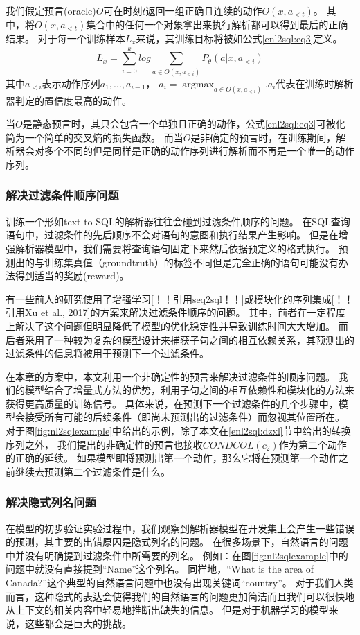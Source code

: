 我们假定预言(oracle)$O$可在时刻$t$返回一组正确且连续的动作$O(x,a_{<t})$。
其中，将$O(x,a_{<t})$集合中的任何一个对象拿出来执行解析都可以得到最后的正确结果。
对于每一个训练样本$L_x$来说，其训练目标将被如公式\ref{enl2sql:eq3}定义。
\begin{equation}
  \label{enl2sql:eq3}
  L_x = \sum_{i=0}^k log \sum_{a\in O(x,a_{<i})} P_{\theta}(a|x,a_{<i})
\end{equation}
其中$a_{<i}$表示动作序列$a_{1},...,a_{i-1}$，
$a_{i} = \mathop{\arg\max}_{a\in O(x,a_{<i})}$,$a_i$代表在训练时解析器判定的置信度最高的动作。

当$O$是静态预言时，其只会包含一个单独且正确的动作，公式\ref{enl2sql:eq3}可被化简为一个简单的交叉熵的损失函数。
而当$O$是非确定的预言时，在训练期间，解析器会对多个不同的但是同样是正确的动作序列进行解析而不再是一个唯一的动作序列。

\subsubsection{解决过滤条件顺序问题}
\label{enl2sql:om}

训练一个形如text-to-SQL的解析器往往会碰到过滤条件顺序的问题。
在SQL查询语句中，过滤条件的先后顺序不会对语句的意图和执行结果产生影响。
但是在增强解析器模型中，我们需要将查询语句固定下来然后依据预定义的格式执行。
预测出的与训练集真值（groundtruth）的标签不同但是完全正确的语句可能没有办法得到适当的奖励(reward)。

有一些前人的研究使用了增强学习[！！引用seq2sql！！]或模块化的序列集成[！！引用Xu et al., 2017]的方案来解决过滤条件顺序的问题。
其中，前者在一定程度上解决了这个问题但明显降低了模型的优化稳定性并导致训练时间大大增加。
而后者采用了一种较为复杂的模型设计来捕获子句之间的相互依赖关系，其预测出的过滤条件的信息将被用于预测下一个过滤条件。

在本章的方案中，本文利用一个非确定性的预言来解决过滤条件的顺序问题。
我们的模型结合了增量式方法的优势，利用子句之间的相互依赖性和模块化的方法来获得更高质量的训练信号。
具体来说，在预测下一个过滤条件的几个步骤中，模型会接受所有可能的后续条件（即尚未预测出的过滤条件）而忽视其位置所在。
对于图\ref{fig:nl2sqlexample}中给出的示例，除了本文在\ref{enl2sql:dzxl}节中给出的转换序列之外，
我们提出的非确定性的预言也接收$CONDCOL(c_2)$作为第二个动作的正确的延续。
如果模型即将预测出第一个动作，那么它将在预测第一个动作之前继续去预测第二个过滤条件是什么。
\subsubsection{解决隐式列名问题}
\label{enl2sql:icn}
在模型的初步验证实验过程中，我们观察到解析器模型在开发集上会产生一些错误的预测，其主要的出错原因是隐式列名的问题。
在很多场景下，自然语言的问题中并没有明确提到过滤条件中所需要的列名。
例如：在图\ref{fig:nl2sqlexample}中的问题中就没有直接提到“Name”这个列名。
同样地，“What is the area of Canada?”这个典型的自然语言问题中也没有出现关键词“country”。
对于我们人类而言，这种隐式的表达会使得我们的自然语言的问题更加简洁而且我们可以很快地从上下文的相关内容中轻易地推断出缺失的信息。
但是对于机器学习的模型来说，这些都会是巨大的挑战。

